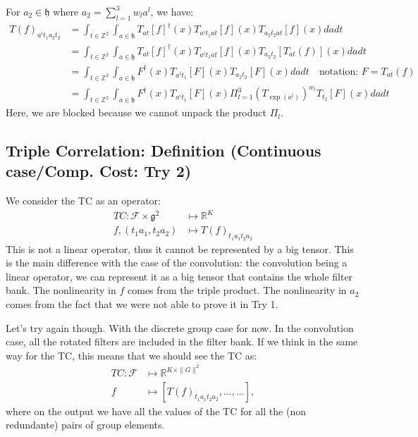 \documentclass{article}
\begin{document}
For $a_2 \in \mathfrak{h}$ where $a_2 = \sum_{l=1}^3 w_l a^l$, we have:
\begin{align*}
    T(f)_{a^it_1a_2t_2}
    &= \int_{t \in \mathbb{Z}^2}
        \int_{a \in \mathfrak{h}}
            T_{at}[f]^\dagger (x) T_{a^it_1at}[f](x) T_{a_2t_2at}[f](x)
                dadt \\
    &= \int_{t \in \mathbb{Z}^2}
        \int_{a \in \mathfrak{h}}
            T_{at}[f]^\dagger (x) T_{a^it_1at}[f](x) T_{a_2t_2}[T_{at}(f)](x)
                dadt \\
    &=\int_{t \in \mathbb{Z}^2}
        \int_{a \in \mathfrak{h}}
            F^\dagger (x) T_{a^it_1}[F](x) T_{a_2t_2}[F](x)
                dadt \quad \text{notation: $F = T_{at}(f)$}\\
  &=\int_{t \in \mathbb{Z}^2}
        \int_{a \in \mathfrak{h}}
            F^\dagger (x) T_{a^it_1}[F](x) \Pi_{l=1}^3\left(T_{\exp(a^l)}\right)^{w_l}T_{t_2}[F](x)
                dadt
\end{align*}
Here, we are blocked because we cannot unpack the product $\Pi_l$.

\subsection{Triple Correlation: Definition (Continuous case/Comp. Cost: Try 2)}

We consider the TC as an operator:
\begin{align*}
    TC: \mathcal{F} \times \mathfrak{g}^2 &\mapsto \mathbb{R}^K \\
        f, (t_1a_1, t_2 a_2) &\mapsto T(f)_{t_1a_1t_2a_2}
\end{align*}
This is not a linear operator, thus it cannot be represented by a big tensor. This is the main difference with the case of the convolution: the convolution being a linear operator, we can represent it as a big tensor that contains the whole filter bank. The nonlinearity in $f$ comes from the triple product. The nonlinearity in $a_2$ comes from the fact that we were not able to prove it in Try 1.

Let's try again though. With the discrete group case for now. In the convolution case, all the rotated filters are included in the filter bank. If we think in the same way for the TC, this means that we should see the TC as:
\begin{align*}
    TC: \mathcal{F}&\mapsto \mathbb{R}^{K \times \|G\|^2} \\
        f  &\mapsto \left[T(f)_{t_1a_1t_2a_2}, ..., ... \right],
\end{align*}
where on the output we have all the values of the TC for all the (non redundante) pairs of group elements.
\end{document}
